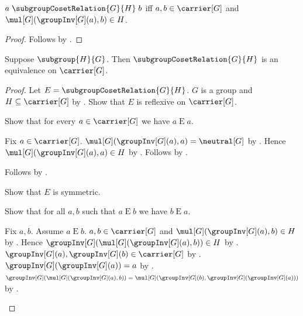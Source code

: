 \begin{proposition}\label{subgroup_coset_relation_iff}
    $a\mathrel{\subgroupCosetRelation{G}{H}}b$ iff
        $a,b\in\carrier[G]$ and
        $\mul[G](\groupInv[G](a),b)\in H$.
\end{proposition}
\begin{proof}
    Follows by .
\end{proof}

\begin{theorem}\label{subgroup_coset_relation_equivalence}
    Suppose $\subgroup{H}{G}$.
    Then $\subgroupCosetRelation{G}{H}$ is an equivalence on
        $\carrier[G]$.
\end{theorem}
\begin{proof}
    Let $E=\subgroupCosetRelation{G}{H}$.
    $G$ is a group and $H\subseteq\carrier[G]$ by
        .
    Show that $E$ is reflexive on $\carrier[G]$.
    \begin{subproof}
        Show that for every $a\in\carrier[G]$ we have $a\mathrel{E}a$.
        \begin{subproof}
            Fix $a\in\carrier[G]$.
            $\mul[G](\groupInv[G](a),a)=\neutral[G]$ by
                .
            Hence $\mul[G](\groupInv[G](a),a)\in H$ by
                .
            Follows by .
        \end{subproof}
        Follows by .
    \end{subproof}
    Show that $E$ is symmetric.
    \begin{subproof}
        Show that for all $a,b$ such that $a\mathrel{E}b$ we have
            $b\mathrel{E}a$.
        \begin{subproof}
            Fix $a,b$.
            Assume $a\mathrel{E}b$.
            $a,b\in\carrier[G]$ and
                $\mul[G](\groupInv[G](a),b)\in H$ by
                .
            Hence
                $\groupInv[G](\mul[G](\groupInv[G](a),b))\in H$ by
                .
            $\groupInv[G](a),\groupInv[G](b)\in\carrier[G]$ by
                .
            $\groupInv[G](\groupInv[G](a))=a$ by
                .
            $\groupInv[G](\mul[G](\groupInv[G](a),b))
                =\mul[G]
                    (\groupInv[G](b),
                     \groupInv[G](\groupInv[G](a)))$ by
                .

\end{subproof}
\end{subproof}
\end{proof}
